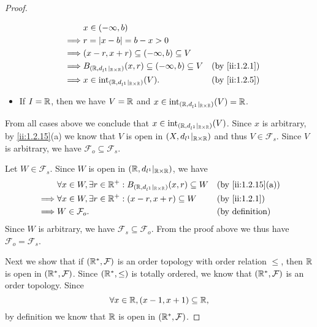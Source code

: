\begin{proof}
\begin{itemize}
\begin{align*}
                     & x \in (-\infty, b)                                                                         \\
            \implies & r = \abs{x - b} = b - x > 0                                                                \\
            \implies & (x - r, x + r) \subseteq (-\infty, b) \subseteq V                                          \\
            \implies & B_{(\R, d_{l^1}|_{\R \times \R})}(x, r) \subseteq (-\infty, b) \subseteq V &  & \by{ii:1.2.1} \\
            \implies & x \in \text{int}_{(\R, d_{l^1}|_{\R \times \R})}(V).                       &  & \by{ii:1.2.5}
          \end{align*}
    \item If \(I = \mathbb{R}\), then we have \(V = \mathbb{R}\) and \(x \in \text{int}_{(\mathbb{R}, d_{l^1}|_{\mathbb{R} \times \mathbb{R}})}(V) = \mathbb{R}\).
  \end{itemize}
  From all cases above we conclude that \(x \in \text{int}_{(\mathbb{R}, d_{l^1}|_{\mathbb{R} \times \mathbb{R}})}(V)\).
  Since \(x\) is arbitrary, by \cref{ii:1.2.15}(a) we know that \(V\) is open in \((X, d_{l^1}|_{\mathbb{R} \times \mathbb{R}})\) and thus \(V \in \mathcal{F}_s\).
  Since \(V\) is arbitrary, we have \(\mathcal{F}_o \subseteq \mathcal{F}_s\).

  Let \(W \in \mathcal{F}_s\).
  Since \(W\) is open in \((\mathbb{R}, d_{l^1}|_{\mathbb{R} \times \mathbb{R}})\), we have
  \begin{align*}
             & \forall x \in W, \exists r \in \R^+ : B_{(\R, d_{l^1}|_{\R \times \R})}(x, r) \subseteq W &  & \by{ii:1.2.15}[a]         \\
    \implies & \forall x \in W, \exists r \in \R^+ : (x - r, x + r) \subseteq W                          &  & \by{ii:1.2.1}             \\
    \implies & W \in \mathcal{F}_o.                                                                      &  & \text{(by definition)}
  \end{align*}
  Since \(W\) is arbitrary, we have \(\mathcal{F}_s \subseteq \mathcal{F}_o\).
  From the proof above we thus have \(\mathcal{F}_o = \mathcal{F}_s\).

  Next we show that if \((\mathbb{R}^*, \mathcal{F})\) is an order topology with order relation \(\leq\), then \(\mathbb{R}\) is open in \((\mathbb{R}^*, \mathcal{F})\).
  Since \((\mathbb{R}^*, \leq)\) is totally ordered, we know that \((\mathbb{R}^*, \mathcal{F})\) is an order topology.
  Since
  \[
    \forall x \in \mathbb{R}, (x - 1, x + 1) \subseteq \mathbb{R},
  \]
  by definition we know that \(\mathbb{R}\) is open in \((\mathbb{R}^*, \mathcal{F})\).


\end{proof}

